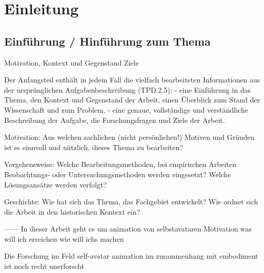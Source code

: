 \chapter{Einleitung}

\section{Einführung / Hinführung zum Thema}
Motivation, Kontext und Gegenstand
Ziele

Der Anfangsteil enthält in jedem Fall die vielfach bearbeiteten Informationen aus der
ursprünglichen Aufgabenbeschreibung (TPD.2.5):
- eine Einführung in das Thema, den Kontext und Gegenstand der Arbeit, einen
Überblick zum Stand der Wissenschaft und zum Problem,
- eine genaue, vollständige und verständliche Beschreibung der Aufgabe, die Forschungsfragen und Ziele der Arbeit.

Motivation: Aus welchen sachlichen (nicht persönlichen!) Motiven und Gründen ist es
sinnvoll und nützlich, dieses Thema zu bearbeiten?

Vorgehensweise: Welche Bearbeitungsmethoden, bei empirischen Arbeiten Beobachtungs- oder Untersuchungsmethoden werden eingesetzt? Welche Lösungsansätze werden verfolgt?

Geschichte: Wie hat sich das Thema, das Fachgebiet entwickelt? Wie ordnet sich die
Arbeit in den historischen Kontext ein?

------
In dieser Arbeit geht es um animation von selbstavataren
Motivation
was will ich erreichen
wie will ichs machen

Die Forschung im Feld self-avatar animation im zusammenhang mit embodiment ist noch recht unerforscht

